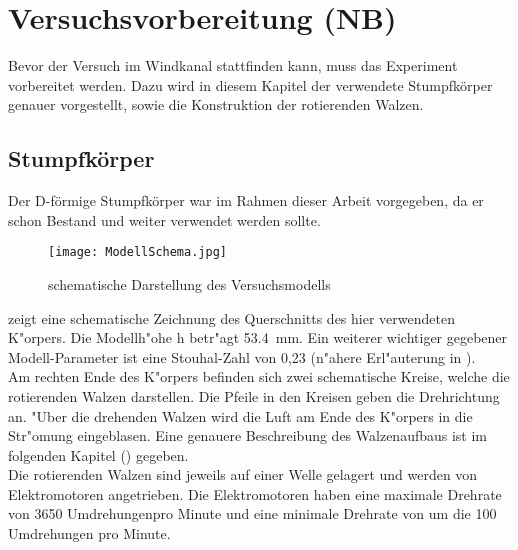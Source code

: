 \chapter{Versuchsvorbereitung (NB)}
\label{s:versuchsvorbereitung}
Bevor der Versuch im Windkanal stattfinden kann, muss das Experiment vorbereitet werden. Dazu wird in diesem Kapitel der verwendete Stumpfk\"orper genauer vorgestellt, sowie die Konstruktion der rotierenden Walzen.
\section{Stumpfk\"orper}
Der D-f\"ormige Stumpfk\"orper war im Rahmen dieser Arbeit vorgegeben, da er schon Bestand und weiter verwendet werden sollte.\\

\begin{figure}[h]
	\centering
	\texttt{[image: ModellSchema.jpg]}
	\caption{schematische Darstellung des Versuchsmodells}
	\label{fig:modelschema}
\end{figure}

 zeigt eine schematische Zeichnung des Querschnitts des hier verwendeten K"orpers. Die Modellh"ohe h betr"agt \SI{53.4}{\milli\meter}.
Ein weiterer wichtiger gegebener Modell-Parameter ist eine Stouhal-Zahl von 0,23 (n"ahere Erl"auterung in ).\\
Am rechten Ende des K"orpers befinden sich zwei schematische Kreise, welche die rotierenden Walzen darstellen. Die Pfeile in den Kreisen geben die Drehrichtung an. "Uber die drehenden Walzen wird die Luft am Ende des K"orpers in die Str"omung eingeblasen. Eine genauere Beschreibung des Walzenaufbaus ist im folgenden Kapitel () gegeben.\\
Die rotierenden Walzen sind jeweils auf einer Welle gelagert und werden von Elektromotoren angetrieben. Die Elektromotoren haben eine maximale Drehrate von 3650 Umdrehungenpro Minute und eine minimale Drehrate von um die 100 Umdrehungen pro Minute.


